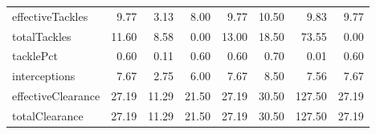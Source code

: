 \begin{table}[H]
\begin{tabular}{lrrrrrrr}
effectiveTackles & 9.77 & 3.13 & 8.00 & 9.77 & 10.50 & 9.83 & 9.77 \\
totalTackles & 11.60 & 8.58 & 0.00 & 13.00 & 18.50 & 73.55 & 0.00 \\
tacklePct & 0.60 & 0.11 & 0.60 & 0.60 & 0.70 & 0.01 & 0.60 \\
interceptions & 7.67 & 2.75 & 6.00 & 7.67 & 8.50 & 7.56 & 7.67 \\
effectiveClearance & 27.19 & 11.29 & 21.50 & 27.19 & 30.50 & 127.50 & 27.19 \\
totalClearance & 27.19 & 11.29 & 21.50 & 27.19 & 30.50 & 127.50 & 27.19 \\
\hline
\end{tabular}
\end{table}
